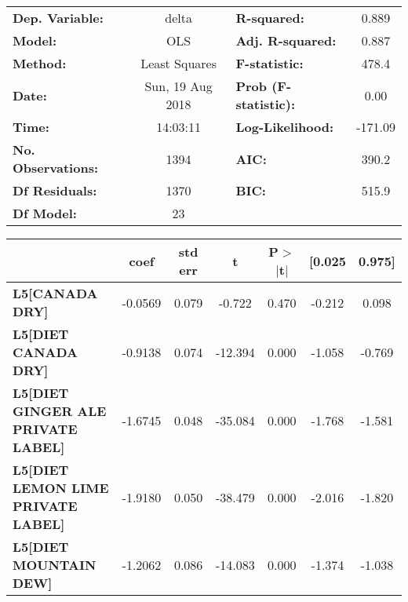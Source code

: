 \begin{center}
\begin{tabular}{lclc}
\toprule
\textbf{Dep. Variable:}                    &      delta       & \textbf{  R-squared:         } &     0.889   \\
\textbf{Model:}                            &       OLS        & \textbf{  Adj. R-squared:    } &     0.887   \\
\textbf{Method:}                           &  Least Squares   & \textbf{  F-statistic:       } &     478.4   \\
\textbf{Date:}                             & Sun, 19 Aug 2018 & \textbf{  Prob (F-statistic):} &     0.00    \\
\textbf{Time:}                             &     14:03:11     & \textbf{  Log-Likelihood:    } &   -171.09   \\
\textbf{No. Observations:}                 &        1394      & \textbf{  AIC:               } &     390.2   \\
\textbf{Df Residuals:}                     &        1370      & \textbf{  BIC:               } &     515.9   \\
\textbf{Df Model:}                         &          23      & \textbf{                     } &             \\
\bottomrule
\end{tabular}
\begin{tabular}{lcccccc}
                                           & \textbf{coef} & \textbf{std err} & \textbf{t} & \textbf{P$>$$|$t$|$} & \textbf{[0.025} & \textbf{0.975]}  \\
\midrule
\textbf{L5[CANADA DRY]}                    &      -0.0569  &        0.079     &    -0.722  &         0.470        &       -0.212    &        0.098     \\
\textbf{L5[DIET CANADA DRY]}               &      -0.9138  &        0.074     &   -12.394  &         0.000        &       -1.058    &       -0.769     \\
\textbf{L5[DIET GINGER ALE PRIVATE LABEL]} &      -1.6745  &        0.048     &   -35.084  &         0.000        &       -1.768    &       -1.581     \\
\textbf{L5[DIET LEMON LIME PRIVATE LABEL]} &      -1.9180  &        0.050     &   -38.479  &         0.000        &       -2.016    &       -1.820     \\
\textbf{L5[DIET MOUNTAIN DEW]}             &      -1.2062  &        0.086     &   -14.083  &         0.000        &       -1.374    &       -1.038     \\

\end{tabular}
\end{center}
